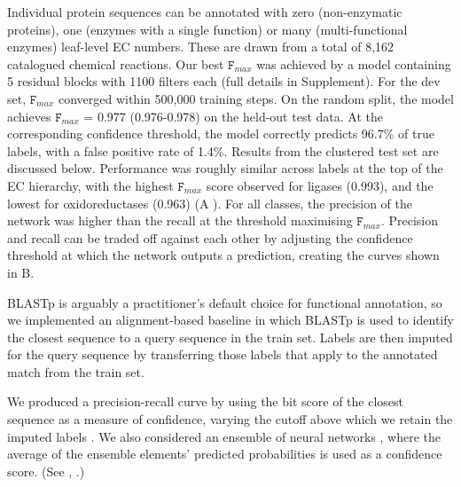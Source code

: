 Individual protein sequences can be annotated with zero (non-enzymatic proteins), one (enzymes with a single function) or many (multi-functional enzymes) leaf-level EC numbers. These are drawn from a total of 8,162 catalogued chemical reactions.
Our best $\texttt{F}_{max}$ was achieved by a model containing 5 residual blocks with 1100 filters each (full details in Supplement). For the dev set, $\texttt{F}_{max}$ converged within 500,000 training steps. On the random split, the model achieves $\texttt{F}_{max}$ = 0.977 (0.976-0.978) on the held-out test data. At the corresponding confidence threshold, the model correctly predicts 96.7\% of true labels, with a false positive rate of 1.4\%. Results from the clustered test set are discussed below.
Performance was roughly similar across labels at the top of the EC hierarchy, with the highest $\texttt{F}_{max}$ score observed for ligases (0.993), and the lowest for oxidoreductases (0.963) (A%
). For all classes, the precision of the network was higher than the recall at the threshold maximising $\texttt{F}_{max}$. Precision and recall can be traded off against each other by adjusting the confidence threshold at which the network outputs a prediction, creating the curves shown in B.%

BLASTp is arguably a practitioner's default choice for functional annotation, so we implemented an alignment-based baseline in which BLASTp is used to identify the closest sequence to a query sequence in the train set. Labels are then imputed for the query sequence by transferring those labels that apply to the annotated match from the train set.

We produced a precision-recall curve by using the bit score of the closest sequence as a measure of confidence, varying the cutoff above which we retain the imputed labels \cite{zhou2019cafa, eddy2011accelerated}. We also considered an ensemble of neural networks \cite{bileschi}, where the average of the ensemble elements' predicted probabilities is used as a confidence score. %
(See , .)

